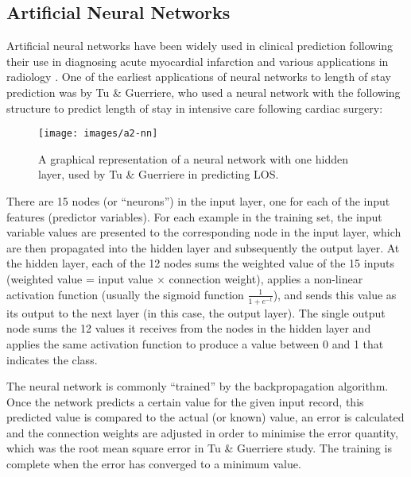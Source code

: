 \subsection{Artificial Neural Networks}
Artificial neural networks have been widely used in clinical prediction
following their use in diagnosing acute myocardial infarction and various
applications in radiology \citep{Baxt1995}.
One of the earliest applications of neural networks to
length of stay prediction was by Tu \& Guerriere, who used a neural network
with the following structure \citep{Tu1993} to predict length of stay in
intensive care following cardiac surgery:
\begin{figure}[h]
\caption{A graphical representation of a neural network with one hidden layer,
used by Tu \& Guerriere in predicting LOS.}
\centering
\texttt{[image: images/a2-nn]}
\end{figure}

There are 15 nodes (or ``neurons'') in the input layer, one for each of the
input features (predictor variables). For each example in the training set,
the input variable values are presented to the corresponding node in the input
layer, which are then propagated into the hidden layer and subsequently the
output layer. At the hidden layer, each of the 12 nodes sums the weighted
value of the 15 inputs (weighted value = input value $\times$ connection
weight), applies a non-linear activation function (usually the sigmoid function
$\frac{1}{1+e^{-t}}$), and sends this value as its output to the next layer
(in this case, the output layer). The single output node sums the 12 values
it receives from the nodes in the hidden layer and applies the same activation
function to produce a value between 0 and 1 that indicates the class.

The neural network is commonly ``trained'' by the backpropagation algorithm.
Once the network predicts a certain value for the given input record, this
predicted value is compared to the actual (or known) value, an error is
calculated and the connection weights are adjusted in order to minimise the
error quantity, which was the root mean square error in Tu \& Guerriere study.
The training is complete when the error has converged to a minimum value.


